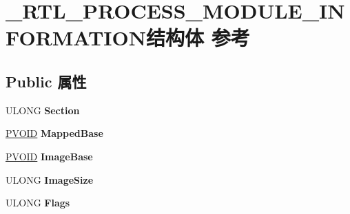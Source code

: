 \hypertarget{struct___r_t_l___p_r_o_c_e_s_s___m_o_d_u_l_e___i_n_f_o_r_m_a_t_i_o_n}{}\section{\+\_\+\+R\+T\+L\+\_\+\+P\+R\+O\+C\+E\+S\+S\+\_\+\+M\+O\+D\+U\+L\+E\+\_\+\+I\+N\+F\+O\+R\+M\+A\+T\+I\+O\+N结构体 参考}
\label{struct___r_t_l___p_r_o_c_e_s_s___m_o_d_u_l_e___i_n_f_o_r_m_a_t_i_o_n}
\subsection*{Public 属性}
\begin{DoxyCompactItemize}
\item 
\mbox{\label{struct___r_t_l___p_r_o_c_e_s_s___m_o_d_u_l_e___i_n_f_o_r_m_a_t_i_o_n_a533d30e304bc9457c550a7e195368db5}} 
U\+L\+O\+NG {\bfseries Section}
\item 
\mbox{\label{struct___r_t_l___p_r_o_c_e_s_s___m_o_d_u_l_e___i_n_f_o_r_m_a_t_i_o_n_a7f97406c0dfac1631dd8e6eff4f1d9af}} 
\hyperlink{interfacevoid}{P\+V\+O\+ID} {\bfseries Mapped\+Base}
\item 
\mbox{\label{struct___r_t_l___p_r_o_c_e_s_s___m_o_d_u_l_e___i_n_f_o_r_m_a_t_i_o_n_a2843fe24e049163c8a8555b2f38c44c6}} 
\hyperlink{interfacevoid}{P\+V\+O\+ID} {\bfseries Image\+Base}
\item 
\mbox{\label{struct___r_t_l___p_r_o_c_e_s_s___m_o_d_u_l_e___i_n_f_o_r_m_a_t_i_o_n_acc4881492d8ca9a8ff6affd3b5b953f2}} 
U\+L\+O\+NG {\bfseries Image\+Size}
\item 
\mbox{\label{struct___r_t_l___p_r_o_c_e_s_s___m_o_d_u_l_e___i_n_f_o_r_m_a_t_i_o_n_a13ddcb1f28ec3f9aa852e5a8e93ac5fd}} 
U\+L\+O\+NG {\bfseries Flags}
\item 

\end{DoxyCompactItemize}
